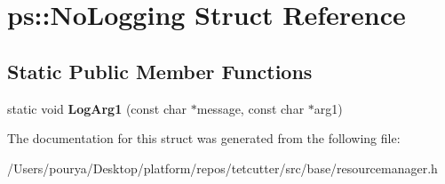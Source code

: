 \hypertarget{structps_1_1NoLogging}{}\section{ps\+:\+:No\+Logging Struct Reference}
\label{structps_1_1NoLogging}
\subsection*{Static Public Member Functions}
\begin{DoxyCompactItemize}
\item 
\hypertarget{structps_1_1NoLogging_a7c8a6cb1444673346df5fe95572d85f8}{}static void {\bfseries Log\+Arg1} (const char $\ast$message, const char $\ast$arg1)\label{structps_1_1NoLogging_a7c8a6cb1444673346df5fe95572d85f8}

\end{DoxyCompactItemize}


The documentation for this struct was generated from the following file\+:\begin{DoxyCompactItemize}
\item 
/\+Users/pourya/\+Desktop/platform/repos/tetcutter/src/base/resourcemanager.\+h\end{DoxyCompactItemize}
